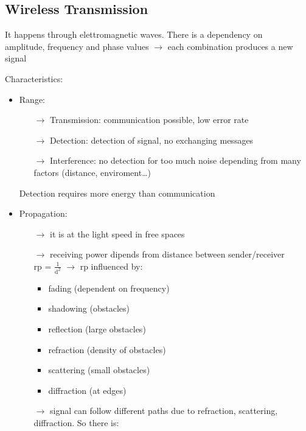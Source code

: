 \subsection{Wireless Transmission}

It happens through elettromagnetic waves. There is a dependency on\\amplitude,
frequency and phase values $\rightarrow$ each combination produces a new signal

Characteristics:
\begin{itemize}
    \item Range:
    \begin{itemize}
        \item[$\rightarrow$] Transmission: communication possible, low error rate
        \item[$\rightarrow$] Detection: detection of signal, no exchanging
        messages
        \item[$\rightarrow$] Interference: no detection for too much noise
        depending from many \\factors (distance, enviroment\dots)
    \end{itemize}
    Detection requires more energy than communication
    \item Propagation:
    \begin{itemize}
        \item[$\rightarrow$] it is at the light speed in free spaces
        \item[$\rightarrow$] receiving power dipends from distance between
        sender/receiver\\
        rp = $\frac{1}{\text{d}^2}$ $\rightarrow$ rp influenced by:
        \begin{itemize}
            \item fading (dependent on frequency)
            \item shadowing (obstacles)
            \item reflection (large obstacles)
            \item refraction (density of obstacles)
            \item scattering (small obstacles)
            \item diffraction (at edges)
        \end{itemize}
        \item[$\rightarrow$] signal can follow different paths due to refraction,
        scattering, diffraction. So there is:
        \begin{itemize}

\end{itemize}
\end{itemize}
\end{itemize}
